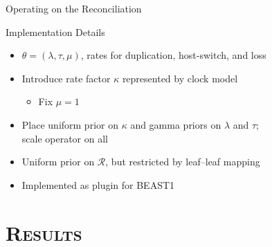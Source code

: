 \documentclass{beamer}
\let\oldsection\section
\renewcommand{\section}[1]{\oldsection{\textsc{#1}}\subsection{}}
\newcommand{\R}{\ensuremath{\mathcal{R}}}
\begin{document}
\begin{frame}{Operating on the Reconciliation}

\end{frame}

\begin{frame}{Implementation Details}

\begin{itemize}

\item $\theta = (\lambda,\tau,\mu)$, rates for duplication, host-switch, and loss \pause

\item Introduce rate factor $\kappa$ represented by clock model
\begin{itemize}
\item Fix $\mu = 1$
\end{itemize}

\pause

\item Place uniform prior on $\kappa$ and gamma priors on $\lambda$ and $\tau$; \\scale operator on all \pause

\item Uniform prior on $\R$, but restricted by leaf--leaf mapping \pause

\item Implemented as plugin for BEAST1

\end{itemize}

\end{frame}

\section{Results}
\end{document}

